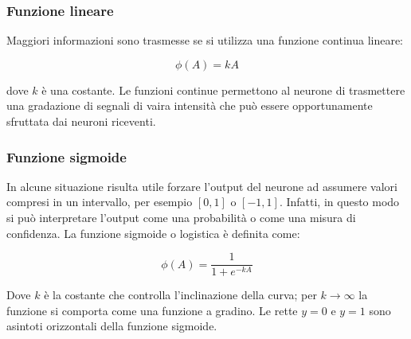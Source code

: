 \subsubsection{Funzione lineare}

Maggiori informazioni sono trasmesse se si utilizza una funzione continua
lineare:

\begin{equation*}
	\phi(A) = kA
\end{equation*}

dove $k$ è una costante. Le funzioni continue permettono al neurone di
trasmettere una gradazione di segnali di vaira intensità che può essere
opportunamente sfruttata dai neuroni riceventi.

\begin{center}
\end{center}

\subsubsection{Funzione sigmoide}

In alcune situazione risulta utile forzare l'output del neurone ad assumere
valori compresi in un intervallo, per esempio $[0, 1]$ o $[-1, 1]$. Infatti, in
questo modo si può interpretare l'output come una probabilità o come una
misura di confidenza. La funzione sigmoide o logistica è definita come:

\begin{equation*}
	\phi(A) = \frac{1}{1 + e^{-kA}}
\end{equation*}

Dove $k$ è la costante che controlla l'inclinazione della curva; per $k
	\rightarrow \infty$ la funzione si comporta come una funzione a gradino. Le
rette $y = 0$ e $y = 1$ sono asintoti orizzontali della funzione sigmoide.

\begin{center}
\end{center}

